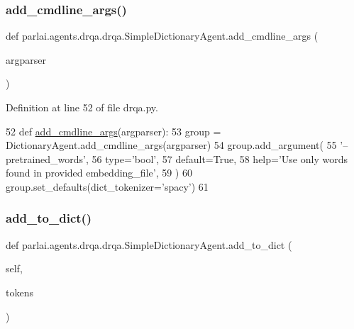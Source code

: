 \subsubsection{\texorpdfstring{add\+\_\+cmdline\+\_\+args()}{add\_cmdline\_args()}}
{\footnotesize\ttfamily def parlai.\+agents.\+drqa.\+drqa.\+Simple\+Dictionary\+Agent.\+add\+\_\+cmdline\+\_\+args (\begin{DoxyParamCaption}\item[{}]{argparser }\end{DoxyParamCaption})\hspace{0.3cm}{\ttfamily [static]}}



Definition at line 52 of file drqa.\+py.


\begin{DoxyCode}
52     \textcolor{keyword}{def }\hyperlink{namespaceparlai_1_1agents_1_1drqa_1_1config_a62fdd5554f1da6be0cba185271058320}{add\_cmdline\_args}(argparser):
53         group = DictionaryAgent.add\_cmdline\_args(argparser)
54         group.add\_argument(
55             \textcolor{stringliteral}{'--pretrained\_words'},
56             type=\textcolor{stringliteral}{'bool'},
57             default=\textcolor{keyword}{True},
58             help=\textcolor{stringliteral}{'Use only words found in provided embedding\_file'},
59         )
60         group.set\_defaults(dict\_tokenizer=\textcolor{stringliteral}{'spacy'})
61 
\end{DoxyCode}
\mbox{\label{classparlai_1_1agents_1_1drqa_1_1drqa_1_1SimpleDictionaryAgent_a5ccaf2bd28a50af2062ad2efd6a36e0e}} 
\subsubsection{\texorpdfstring{add\+\_\+to\+\_\+dict()}{add\_to\_dict()}}
{\footnotesize\ttfamily def parlai.\+agents.\+drqa.\+drqa.\+Simple\+Dictionary\+Agent.\+add\+\_\+to\+\_\+dict (\begin{DoxyParamCaption}\item[{}]{self,  }\item[{}]{tokens }\end{DoxyParamCaption})}

